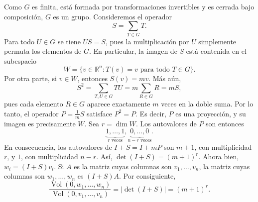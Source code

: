 \documentclass[11pt]{amsproc}
\begin{document}
Como $ G$ es finita, está formada por transformaciones invertibles y
es cerrada bajo composición, $ G$ es un grupo.
Consideremos el operador
\[
    S=\sum_{T\in G}T.
\]
Para todo $U\in G$ se tiene
$US=S$, 
pues la multiplicación por $U$ simplemente permuta los elementos de
$ G$. En particular, la imagen de $S$ está contenida en el subespacio
\[
    W=\{v\in\mathbb R^n:T(v)=v\text{ para todo }T\in G\}.
\]
Por otra parte, si $v\in W$, entonces
$S(v)=mv$. 
Más aún,
\[
    S^2
    =\sum_{T,U\in G}TU
    =m\sum_{R\in G}R
    =mS,
\]
pues cada elemento $R\in G$ aparece exactamente $m$ veces en la
doble suma.
Por lo tanto, el operador
$P=\frac1mS$ 
satisface $P^2=P$. Es decir, $P$ es una proyección, y su imagen es
precisamente $W$.
Sea $r=\dim W$. Los autovalores de $P$ son entonces
\[
    \underbrace{1,\dots,1}_{r\text{ veces}},
    \underbrace{0,\dots,0}_{n-r\text{ veces}}.
\]
En consecuencia, los autovalores de
$I+S=I+mP$ 
son $m+1$, con multiplicidad $r$, y $1$, con multiplicidad $n-r$. Así,
$\det(I+S)=(m+1)^r$. 
Ahora bien,
$w_i=(I+S)v_i$.
Si $A$ es la matriz cuyas columnas son $v_1,\dots,v_n$, la matriz cuyas
columnas son $w_1,\dots,w_n$ es
$(I+S)A$.
Por consiguiente,
\[
    \frac{\operatorname{Vol}(0,w_1,\dots,w_n)}
         {\operatorname{Vol}(0,v_1,\dots,v_n)}
    =
    |\det(I+S)|
    =(m+1)^r.
\]
\end{document}
